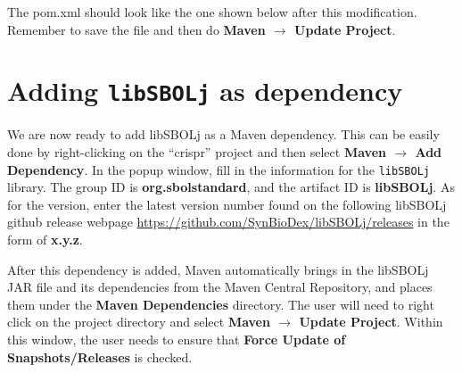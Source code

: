 The pom.xml should look like the one shown below after this modification. Remember to save the file and then do {\bf Maven $\rightarrow$  Update Project}.

\begin{minipage}{\textwidth} 

\end{minipage}

\section*{Adding {\tt libSBOLj} as dependency}
We are now ready to add libSBOLj as a Maven dependency. This can be easily done by right-clicking on the ``crispr'' project and then select {\bf Maven $\rightarrow$ Add Dependency}.
In the popup window, fill in the information for the {\tt libSBOLj} library. The group ID is {\bf org.sbolstandard}, and the artifact ID is {\bf libSBOLj}. As for the version, enter the latest version number found on the following libSBOLj github release webpage \url{https://github.com/SynBioDex/libSBOLj/releases} in the form of {\bf x.y.z}. 

After this dependency is added, Maven automatically brings in the libSBOLj JAR file and its dependencies from the Maven Central Repository, and places them under the {\bf Maven Dependencies} directory. The user will need to right click on the project directory and select {\bf Maven $\rightarrow$ Update Project}. Within this window, the user needs to ensure that {\bf Force Update of Snapshots/Releases} is checked. 


